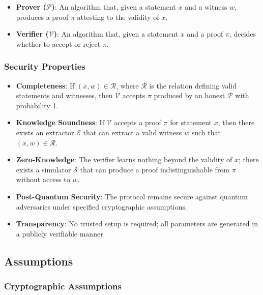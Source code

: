 \documentclass{article}
\theoremstyle{plain}
\theoremstyle{definition}
\theoremstyle{remark}
\theoremstyle{problem}
\begin{document}
\begin{itemize}
    \item \textbf{Prover (\(\mathcal{P}\))}: An algorithm that, given a statement \(x\) and a witness \(w\), produces a proof \(\pi\) attesting to the validity of \(x\).
    \item \textbf{Verifier (\(\mathcal{V}\))}: An algorithm that, given a statement \(x\) and a proof \(\pi\), decides whether to accept or reject \(\pi\).
\end{itemize}

\subsubsection{Security Properties}

\begin{itemize}
    \item \textbf{Completeness}: If \((x, w) \in \mathcal{R}\), where \(\mathcal{R}\) is the relation defining valid statements and witnesses, then \(\mathcal{V}\) accepts \(\pi\) produced by an honest \(\mathcal{P}\) with probability 1.
    \item \textbf{Knowledge Soundness}: If \(\mathcal{V}\) accepts a proof \(\pi\) for statement \(x\), then there exists an extractor \(\mathcal{E}\) that can extract a valid witness \(w\) such that \((x, w) \in \mathcal{R}\).
    \item \textbf{Zero-Knowledge}: The verifier learns nothing beyond the validity of \(x\); there exists a simulator \(\mathcal{S}\) that can produce a proof indistinguishable from \(\pi\) without access to \(w\).
    \item \textbf{Post-Quantum Security}: The protocol remains secure against quantum adversaries under specified cryptographic assumptions.
    \item \textbf{Transparency}: No trusted setup is required; all parameters are generated in a publicly verifiable manner.
\end{itemize}

\subsection{Assumptions}

\subsubsection{Cryptographic Assumptions}
\end{document}
